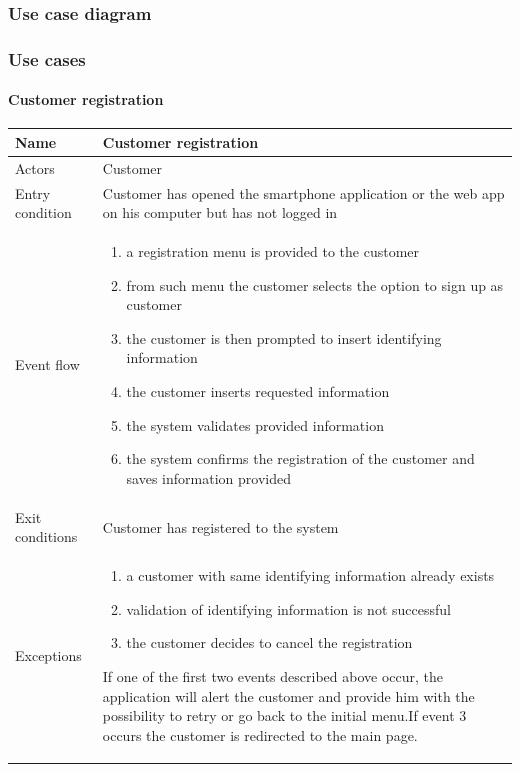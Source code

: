 \subsubsection{Use case diagram}
\subsubsection{Use cases}
\paragraph{Customer registration}
\begin{flushleft}
	\begin{tabular} { | m{3cm} | m{10cm} | }
		\hline
		Name & Customer registration\\
		\hline
		Actors & Customer\\
		\hline
		Entry condition & Customer has opened the smartphone application or the web app on his computer but has not logged in\\
		\hline
		Event flow & \begin{enumerate}
			\item a registration menu is provided to the customer
			\item from such menu the customer selects the option to sign up as customer
			\item the customer is then prompted to insert identifying information
			\item the customer inserts requested information
			\item the system validates provided information
			\item the system confirms the registration of the customer and saves information provided
		\end{enumerate}\\
		\hline
		Exit conditions & Customer has registered to the system\\
		\hline
		Exceptions & \begin{enumerate}
			\item a customer with same identifying information already exists
			\item validation of identifying information is not successful
			\item the customer decides to cancel the registration
		\end{enumerate}
		If one of the first two events described above occur, the application will alert the customer and provide him with the possibility to retry or go back to the initial menu.\newline If event 3 occurs the customer is redirected to the main page.\\
		\hline
	\end{tabular}
\end{flushleft}

